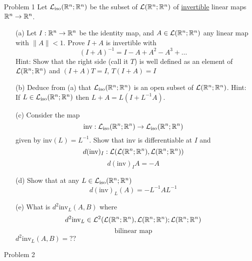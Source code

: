 \documentclass{hmwk}
\begin{document}
\maketitle

\begin{problem}{Problem 1}
Let $\mathcal{L}_{\text{iso}}(\mathbb{R}^n; \mathbb{R}^n)$ be the subset of $\mathcal{L}(\mathbb{R}^n; \mathbb{R}^n)$ of \underline{invertible} linear maps $\mathbb{R}^n \rightarrow \mathbb{R}^n$.
\begin{itemize}
    \item[(a)] Let $I: \mathbb{R}^n \rightarrow \mathbb{R}^n$ be the identity map, and $A \in \mathcal{L}(\mathbb{R}^n ; \mathbb{R}^n)$ any linear map with $\|A\| < 1$. Prove $I + A$ is invertible with $$(I + A)^{-1} = I - A + A^2 - A^3 + \dots$$ 
    Hint: Show that the right side (call it $T$) is well defined as an element of $\mathcal{L}(\mathbb{R}^n; \mathbb{R}^n)$ and $(I + A)T = I$, $T(I + A) = I$
    \item[(b)] Deduce from (a) that $\mathcal{L}_{\text{iso}}(\mathbb{R}^n; \mathbb{R}^n)$ is an open subset of $\mathcal{L}(\mathbb{R}^n; \mathbb{R}^n)$. Hint: If $L \in \mathcal{L}_{\text{iso}}(\mathbb{R}^n; \mathbb{R}^n)$ then $L + A = L(I + L^{-1}A)$. 
    \item[(c)] Consider the map
    $$\text{inv}: \mathcal{L}_{\text{iso}}(\mathbb{R}^n; \mathbb{R}^n) \rightarrow \mathcal{L}_{\text{iso}}(\mathbb{R}^n; \mathbb{R}^n)$$ given by inv$(L) = L^{-1}$.
    Show that inv is differentiable at $I$ and $$d(\text{inv})_I: \mathcal{L}(\mathcal{L}(\mathbb{R}^n; \mathbb{R}^n), \mathcal{L}(\mathbb{R}^n; \mathbb{R}^n))$$ 
    $$d(\text{inv})_IA = -A$$
    \item[(d)] Show that at any $L \in \mathcal{L}_{\text{iso}}(\mathbb{R}^n; \mathbb{R}^n)$
    $$d(\text{inv})_L(A) = -L^{-1}AL^{-1}$$
    \item[(e)] What is $d^2\text{inv}_L(A, B)$ where $$d^2\text{inv}_L \in \mathcal{L}^2(\mathcal{L}(\mathbb{R}^n;\mathbb{R}^n), \mathcal{L}(\mathbb{R}^n;\mathbb{R}^n); \mathcal{L}(\mathbb{R}^n;\mathbb{R}^n)$$
    $$\text{bilinear map}$$
    $d^2\text{inv}_L(A, B) = ??$
\end{itemize}
\end{problem}

\begin{solution}
    
\end{solution}

\begin{problem}{Problem 2}
    
\end{problem}
\end{document}
